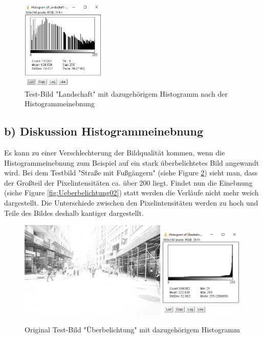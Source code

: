 \documentclass[12pt,german]{article}
\begin{document}
\begin{enumerate}
\begin{figure}[h!]
	\includegraphics[width=4cm]{../testData/Results/Landschaft/Landschaft-equalized-histogram.png}
	\caption{Test-Bild "Landschaft" mit dazugehörigem Histogramm nach der Histogrammeinebnung}
	 \label{fig:Landschaft02}
\end{figure}


\end{enumerate}


\pagebreak
\subsection {b) Diskussion Histogrammeinebnung}
Es kann zu einer Verschlechterung der Bildqualität kommen, wenn die Histogrammeinebnung zum Beispiel auf ein stark überbelichtetes Bild angewandt wird. Bei dem Testbild "Straße mit Fußgängern"  (siehe Figure \ref{fig:Ueberbelichtung01}) sieht man, dass der Großteil der Pixelintensitäten ca. über 200 liegt. Findet nun die Einebnung  (siehe Figure \ref{fig:Ueberbelichtung02}) statt werden die Verläufe nicht mehr weich dargestellt. Die Unterschiede zwischen den Pixelintensitäten werden zu hoch und Teile des Bildes deshalb kantiger dargestellt.
\begin{figure}[h!] \centering
	\includegraphics[width=7cm]{../testData/Results/Ueberbelichtung/Ueberbelichtung.jpg}
	\includegraphics[width=4cm]{../testData/Results/Ueberbelichtung/Ueberbelichtung-histogram.png}
	\caption{Original Test-Bild "Überbelichtung" mit dazugehörigem Histogramm}
	\label{fig:Ueberbelichtung01}
\end{figure}
\end{document}
